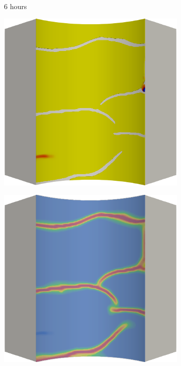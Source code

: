 \begin{figure}[!htbp]
  \begin{subfigure}{0.15\textwidth}
    \centering
    \caption*{6 hours}
  \end{subfigure}
  \begin{subfigure}{0.19\textwidth}
    \centering
    \includegraphics[width=\textwidth]{Chapter5/figures/spallation/c.0036}
  \end{subfigure}
  \hspace{0.06\textwidth}
  \begin{subfigure}{0.19\textwidth}
    \centering
    \includegraphics[width=\textwidth]{Chapter5/figures/spallation/d.0036}

\end{subfigure}
\end{figure}
